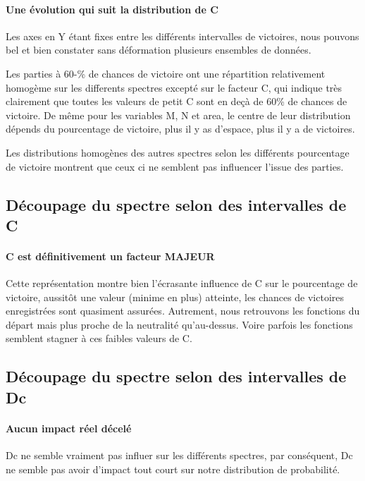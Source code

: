 \paragraph{Une évolution qui suit la distribution de C}
Les axes en Y étant fixes entre les différents intervalles de victoires, nous pouvons bel et bien constater sans déformation plusieurs ensembles de données.

Les parties à 60-\% de chances de victoire ont une répartition relativement homogème sur les differents spectres excepté sur le facteur C, qui indique très clairement que toutes les valeurs de petit C sont en deçà de 60\% de chances de victoire.
De même pour les variables M, N et area, le centre de leur distribution dépends du pourcentage de victoire, plus il y as d'espace, plus il y a de victoires.

Les distributions homogènes des autres spectres selon les différents pourcentage de victoire montrent que ceux ci ne semblent pas influencer l'issue des parties.



\subsection{Découpage du spectre selon des intervalles de C}
\paragraph{C est définitivement un facteur MAJEUR}
Cette représentation montre bien l'écrasante influence de C sur le pourcentage de victoire, aussitôt une valeur (minime en plus) atteinte, les chances de victoires enregistrées sont quasiment assurées.
Autrement, nous retrouvons les fonctions du départ mais plus proche de la neutralité qu'au-dessus.
Voire parfois les fonctions semblent stagner à ces faibles valeurs de C.




\subsection{Découpage du spectre selon des intervalles de Dc}
\paragraph{Aucun impact réel décelé}
Dc ne semble vraiment pas influer sur les différents spectres, par conséquent, Dc ne semble pas avoir d'impact tout court sur notre distribution de probabilité.



